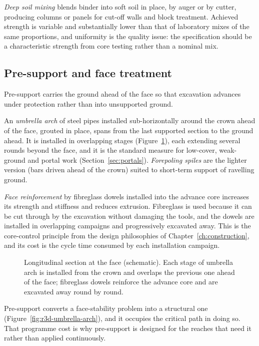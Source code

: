 \emph{Deep soil mixing} blends binder into soft soil in place, by auger or by
cutter, producing columns or panels for cut-off walls and block treatment.
Achieved strength is variable and substantially lower than that of laboratory
mixes of the same proportions, and uniformity is the quality issue: the specification
should be a characteristic strength from core testing rather than a nominal
mix.

\subsection{Pre-support and face treatment}
\label{sec:presupport-face}

Pre-support carries the ground ahead of the face so that excavation advances
under protection rather than into unsupported ground.

An \emph{umbrella arch} of steel pipes installed sub-horizontally around the
crown ahead of the face, grouted in place, spans from the last supported
section to the ground ahead. It is installed in overlapping stages
(Figure~\ref{fig:presupport}), each
extending several rounds beyond the face, and it is the standard measure for
low-cover, weak-ground and portal work (Section~\ref{sec:portals}). \emph{Forepoling spiles} are the
lighter version (bars driven ahead of the crown) suited to short-term
support of ravelling ground.

\emph{Face reinforcement} by fibreglass dowels installed into the advance core
increases its strength and stiffness and reduces extrusion. Fibreglass is used
because it can be cut through by the excavation without damaging the tools, and
the dowels are installed in overlapping campaigns and progressively excavated
away. This is the core-control principle from the design philosophies of
Chapter~\ref{ch:construction}, and its cost is the cycle time consumed by each
installation campaign.

\begin{figure}[htbp]
\centering
{}
\caption{Longitudinal section at the face (schematic). Each stage of umbrella arch is installed from the crown and overlaps the previous one ahead of the face; fibreglass dowels reinforce the advance core and are excavated away round by round.}
\label{fig:presupport}
\end{figure}

Pre-support converts a face-stability problem into a
structural one (Figure~\ref{fig:r3d-umbrella-arch}), and it occupies the critical path in doing so. That programme
cost is why pre-support is designed for the reaches that need it rather than
applied continuously.

